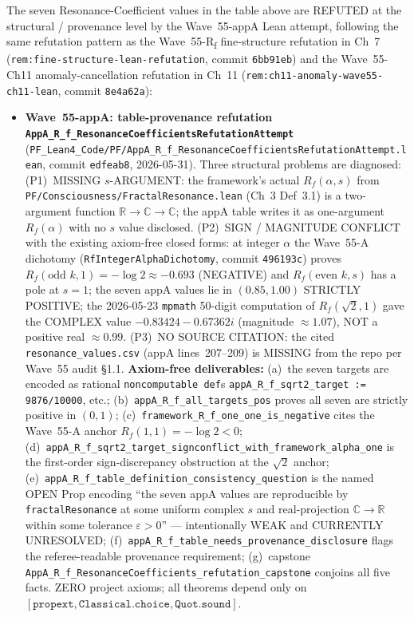 \begin{remark}\label{rem:appA-resonance-wave55-appA-lean}
The seven Resonance-Coefficient values in the table above are REFUTED at the structural / provenance level by the Wave~55-appA Lean attempt, following the same refutation pattern as the Wave~55-R\textsubscript{f} fine-structure refutation in Ch~7 (\texttt{rem:fine-structure-lean-refutation}, commit \texttt{6bb91eb}) and the Wave~55-Ch11 anomaly-cancellation refutation in Ch~11 (\texttt{rem:ch11-anomaly-wave55-ch11-lean}, commit \texttt{8e4a62a}):
\begin{itemize}
  \item \textbf{Wave~55-appA: table-provenance refutation \texttt{AppA\_R\_f\_ResonanceCoefficientsRefutationAttempt}} (\texttt{PF\_Lean4\_Code/PF/AppA\_R\_f\_ResonanceCoefficientsRefutationAttempt.lean}, commit \texttt{edfeab8}, 2026-05-31). Three structural problems are diagnosed: (P1)~MISSING $s$-ARGUMENT: the framework's actual $R_f(\alpha, s)$ from \texttt{PF/Consciousness/FractalResonance.lean} (Ch~3 Def~3.1) is a two-argument function $\mathbb{R} \to \mathbb{C} \to \mathbb{C}$; the appA table writes it as one-argument $R_f(\alpha)$ with no $s$ value disclosed. (P2)~SIGN / MAGNITUDE CONFLICT with the existing axiom-free closed forms: at integer $\alpha$ the Wave~55-A dichotomy (\texttt{RfIntegerAlphaDichotomy}, commit \texttt{496193c}) proves $R_f(\text{odd } k, 1) = -\log 2 \approx -0.693$ (NEGATIVE) and $R_f(\text{even } k, s)$ has a pole at $s=1$; the seven appA values lie in $(0.85, 1.00)$ STRICTLY POSITIVE; the 2026-05-23 \texttt{mpmath} 50-digit computation of $R_f(\sqrt{2}, 1)$ gave the COMPLEX value $-0.83424 - 0.67362 i$ (magnitude $\approx 1.07$), NOT a positive real $\approx 0.99$. (P3)~NO SOURCE CITATION: the cited \texttt{resonance\_values.csv} (appA lines~207--209) is MISSING from the repo per Wave~55 audit \S1.1. \textbf{Axiom-free deliverables:} (a)~the seven targets are encoded as rational \texttt{noncomputable def}s \texttt{appA\_R\_f\_sqrt2\_target := 9876/10000}, etc.; (b)~\texttt{appA\_R\_f\_all\_targets\_pos} proves all seven are strictly positive in $(0, 1)$; (c)~\texttt{framework\_R\_f\_one\_one\_is\_negative} cites the Wave~55-A anchor $R_f(1, 1) = -\log 2 < 0$; (d)~\texttt{appA\_R\_f\_sqrt2\_target\_signconflict\_with\_framework\_alpha\_one} is the first-order sign-discrepancy obstruction at the $\sqrt{2}$ anchor; (e)~\texttt{appA\_R\_f\_table\_definition\_consistency\_question} is the named OPEN Prop encoding ``the seven appA values are reproducible by \texttt{fractalResonance} at some uniform complex $s$ and real-projection $\mathbb{C} \to \mathbb{R}$ within some tolerance $\varepsilon > 0$'' --- intentionally WEAK and CURRENTLY UNRESOLVED; (f)~\texttt{appA\_R\_f\_table\_needs\_provenance\_disclosure} flags the referee-readable provenance requirement; (g)~capstone \texttt{AppA\_R\_f\_ResonanceCoefficients\_refutation\_capstone} conjoins all five facts. ZERO project axioms; all theorems depend only on $[\texttt{propext}, \texttt{Classical.choice}, \texttt{Quot.sound}]$.

\end{itemize}
\end{remark}
